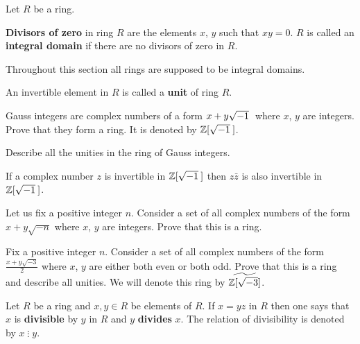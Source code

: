 \documentclass[12pt]{article}
\newcommand{\delit}{\operatorname{\vdots}}
\begin{document}



Let $R$ be a ring.

\begin{opredelenie} {\bf Divisors of zero} in ring $R$ are the
  elements $x$, $y$ such that $xy=0$.  $R$ is called an {\bf integral
    domain} if there are no divisors of zero in $R$.
\end{opredelenie}

Throughout this section all rings are supposed to be integral domains.

\begin{opredelenie}
  An invertible element in $R$ is called a {\bf unit} of ring $R$.
\end{opredelenie}

\begin{zadacha} 
Gauss integers are complex numbers of a form $x + y \sqrt{-1}\:$ where $x$, $y$
are integers. Prove that they form a ring. It is denoted by ${\mathbb Z}[\sqrt{-1}\:]$.
\end{zadacha}

\begin{zadacha} Describe all the unities in the ring of Gauss integers.
\end{zadacha}

\begin{ukazanie} If a complex number $z$ is invertible in ${\mathbb Z}[\sqrt{-1}\:]$ then
  $z \bar z$ is also invertible in ${\mathbb Z}[\sqrt{-1}\:]$.
\end{ukazanie}

\begin{zadacha} Let us fix a positive integer $n$.
Consider a set of all complex numbers of the form $x + y \sqrt{-n}$
where $x$, $y$ are integers. Prove that this is a ring.
\end{zadacha}

\begin{zadacha}[*]
Fix a positive integer $n$.  Consider a set of all complex numbers of
the form $\frac{x + y \sqrt{-3}}2$ where $x$, $y$ are either both even
or both odd.  Prove that this is a ring and describe all unities.  We
will denote this ring by $\widetilde{{\mathbb Z}[\sqrt{-3}]}$.
\end{zadacha}

\begin{opredelenie}
Let $R$ be a ring and $x, y\in R$ be elements of $R$.  If $x= yz$ in
$R$ then one says that $x$ is {\bf divisible} by $y$ in $R$ and $y$
{\bf divides} $x$.  The relation of divisibility is denoted by
$x\delit y$.
\end{opredelenie}
\end{document}
